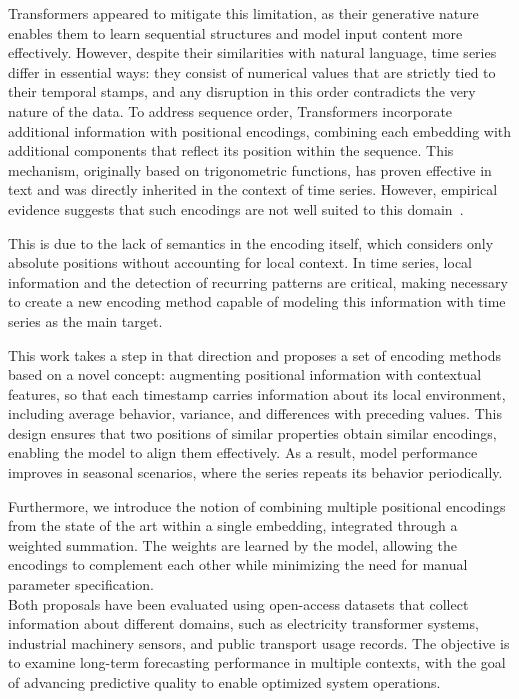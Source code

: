 Transformers appeared to mitigate this limitation, as their generative nature enables them to learn sequential structures and model input content more effectively. However, despite their similarities with natural language, time series differ in essential ways: they consist of numerical values that are strictly tied to their temporal stamps, and any disruption in this order contradicts the very nature of the data. 
To address sequence order, Transformers incorporate additional information with positional encodings, combining each embedding with additional components that reflect its position within the sequence. This mechanism, originally based on trigonometric functions, has proven effective in text and was directly inherited in the context of time series. However, empirical evidence suggests that such encodings are not well suited to this domain~\cite{zeng2022transformerseffectivetimeseries}.\vspace{0.35em}

This is due to the lack of semantics in the encoding itself, which considers only absolute positions without accounting for local context. In time series, local information and the detection of recurring patterns are critical, making necessary to create a new encoding method capable of modeling this information with time series as the main target.\vspace{0.35em}

This work takes a step in that direction and proposes a set of encoding methods based on a novel concept: augmenting positional information with contextual features, so that each timestamp carries information about its local environment, including average behavior, variance, and differences with preceding values. This design ensures that two positions of similar properties obtain similar encodings, enabling the model to align them effectively. As a result, model performance improves in seasonal scenarios, where the series repeats its behavior periodically.\vspace{0.35em}

Furthermore, we introduce the notion of combining multiple positional encodings from the state of the art within a single embedding, integrated through a weighted summation. The weights are learned by the model, allowing the encodings to complement each other while minimizing the need for manual parameter specification.\\
Both proposals have been evaluated using open-access datasets that collect information about different domains, such as electricity transformer systems, industrial machinery sensors, and public transport usage records. The objective is to examine long-term forecasting performance in multiple contexts, with the goal of advancing predictive quality to enable optimized system operations.\vspace{0.35em}

